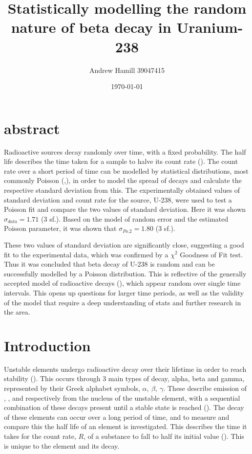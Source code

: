 \documentclass[11pt]{article}
\begin{document}
\title{\vspace{-1cm}Statistically modelling the random nature of beta decay in Uranium-238}
    \author{Andrew Hamill 39047415}
    \date{\today}
    \maketitle
    \section{abstract}
Radioactive sources decay randomly over time, with a fixed probability. The half life describes the time taken for a sample to halve its count rate (\cite{YF}). The count rate over a short period of time can be modelled by statistical distributions, most commonly Poisson (\cite{campbell2008poisson},\cite{buczyk2009poisson}), in order to model the spread of decays and calculate the respective standard deviation from this. The experimentally obtained values of standard deviation and count rate for the source, U-238, were used to test a Poisson fit and compare the two values of standard deviation. Here it was shown $\sigma_{data} = 1.71$ (3 sf.). Based on the model of random error and the estimated Poisson parameter, it was shown that $\sigma_{Po.2} = 1.80$ (3 sf.).
     
\noindent These two values of standard deviation are significantly close, suggesting a good fit to the experimental data, which was confirmed by a $\chi^{2}$ Goodness of Fit test. Thus it was concluded that beta decay of U-238 is random and can be successfully modelled by a Poisson distribution. This is reflective of the generally accepted model of radioactive decays (\cite{YF}), which appear random over single time intervals. This opens up questions for larger time periods, as well as the validity of the model that require a deep understanding of stats and further research in the area.
    \section{Introduction}
Unstable elements undergo radioactive decay over their lifetime in order to reach stability (\cite{YF}). This occurs through 3 main types of decay, alpha, beta and gamma, represented by their Greek alphabet symbols, $\alpha,\  \beta,\ \gamma$.  These describe emission of , , and  respectively from the nucleus of the unstable element, with a sequential combination of these decays present until a stable state is reached (\cite{Magill2005}). The decay of these elements can occur over a long period of time, and to measure and compare this the half life of an element is investigated. This describes the time it takes for the count rate, $R$, of a substance to fall to half its initial value (\cite{YF}). This is unique to the element and its decay.
    
\end{document}
